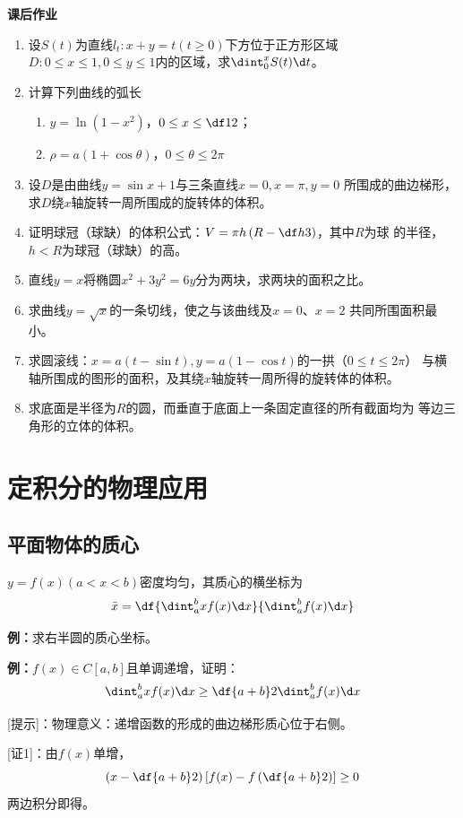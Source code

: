 \begin{ext}
	{\bf 课后作业}
	\begin{enumerate}
	  \item 设$S(t)$为直线$l_t:x+y=t(t\geq0)$下方位于正方形区域
	  $D:0\leq x\leq 1,0\leq y\leq 1$内的区域，求$\dint_0^xS(t)\d t$。
	  \item 计算下列曲线的弧长
	  \begin{enumerate}[(1)]
	    \item $y=\ln(1-x^2)$，$0\leq x\leq\df12$；
	    \item $\rho=a(1+\cos\theta)$，$0\leq\theta\leq2\pi$
	  \end{enumerate}
	  \item 设$D$是由曲线$y=\sin x+1$与三条直线$x=0,x=\pi,y=0$
	  所围成的曲边梯形，求$D$绕$x$轴旋转一周所围成的旋转体的体积。
	  \item 证明球冠（球缺）的体积公式：$V=\pi h\left(R-\df h3\right)$，其中$R$为球
	  的半径，$h<R$为球冠（球缺）的高。
	  \item 直线$y=x$将椭圆$x^2+3y^2=6y$分为两块，求两块的面积之比。
	  \item 求曲线$y=\sqrt x$的一条切线，使之与该曲线及$x=0$、$x=2$
	  共同所围面积最小。
	  \item 求圆滚线：$x=a(t-\sin t),y=a(1-\cos t)$的一拱（$0\leq t\leq 2\pi$）
	  与横轴所围成的图形的面积，及其绕$x$轴旋转一周所得的旋转体的体积。
	  \item 求底面是半径为$R$的圆，而垂直于底面上一条固定直径的所有截面均为
	  等边三角形的立体的体积。
	\end{enumerate}
\end{ext}

\section{定积分的物理应用}

\subsection{平面物体的质心}
$y=f(x)(a<x<b)$密度均匀，其质心的横坐标为
$$\bar{x}=\df{\dint_a^bxf(x)\d x}{\dint_a^bf(x)\d x}$$

{\bf 例：}求右半圆的质心坐标。

{\bf 例：}$f(x)\in C[a,b]$且单调递增，证明：
$$\dint_a^bxf(x)\d x\geq\df{a+b}2\dint_a^bf(x)\d x$$

[提示]：物理意义：递增函数的形成的曲边梯形质心位于右侧。

[证1]：由$f(x)$单增，
$$\left(x-\df{a+b}2\right)\left[f(x)-f\left(
\df{a+b}2\right)\right]\geq0$$
两边积分即得。
\fin


